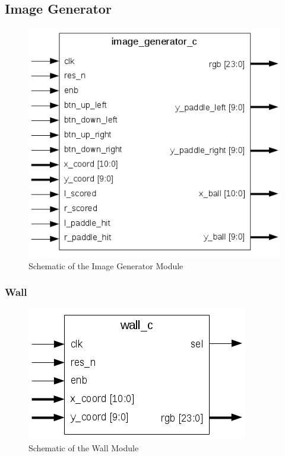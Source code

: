     \subsection{Image Generator}
	    \begin{figure}[h]
		    \centering
		    \includegraphics[scale=0.7]{images/image_generator_schematic.png}
		    \caption{Schematic of the Image Generator Module}
		    \label{img_gen_sch}
	    \end{figure}

        \subsubsection{Wall}
	        \begin{figure}[h]
		        \centering
		        \includegraphics[scale=0.7]{images/wall_schematic.png}
		        \caption{Schematic of the Wall Module}
		        \label{wall_sch}
	        \end{figure}
